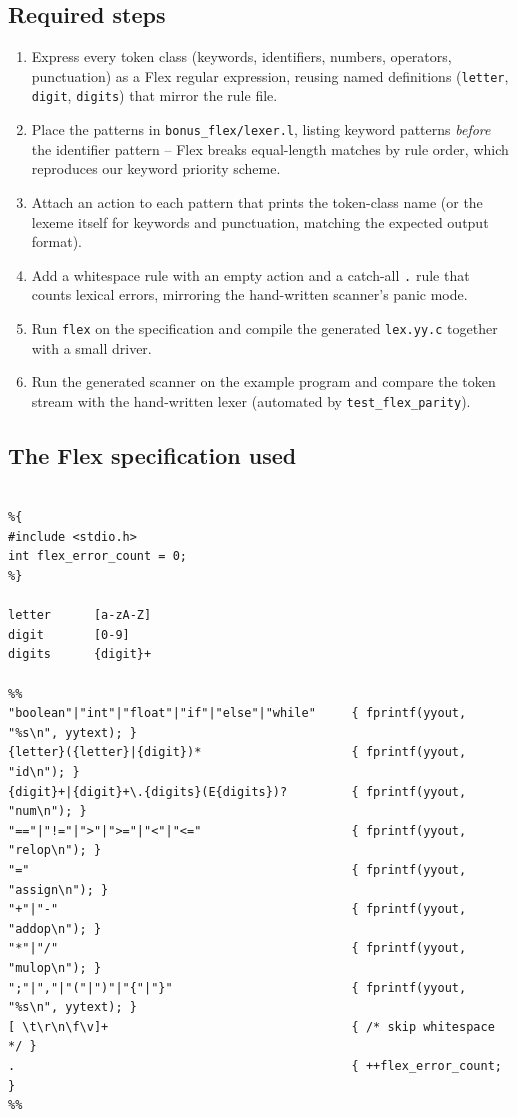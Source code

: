 \documentclass[11pt,a4paper]{article}
\begin{document}
\subsection{Required steps}
\begin{enumerate}
    \item Express every token class (keywords, identifiers, numbers, operators,
          punctuation) as a Flex regular expression, reusing named definitions
          (\texttt{letter}, \texttt{digit}, \texttt{digits}) that mirror the rule
          file.
    \item Place the patterns in \texttt{bonus\_flex/lexer.l}, listing keyword
          patterns \emph{before} the identifier pattern -- Flex breaks
          equal-length matches by rule order, which reproduces our keyword
          priority scheme.
    \item Attach an action to each pattern that prints the token-class name
          (or the lexeme itself for keywords and punctuation, matching the
          expected output format).
    \item Add a whitespace rule with an empty action and a catch-all \texttt{.}
          rule that counts lexical errors, mirroring the hand-written scanner's
          panic mode.
    \item Run \texttt{flex} on the specification and compile the generated
          \texttt{lex.yy.c} together with a small driver.
    \item Run the generated scanner on the example program and compare the token
          stream with the hand-written lexer (automated by
          \texttt{test\_flex\_parity}).
\end{enumerate}

\subsection{The Flex specification used}
\begin{lstlisting}[basicstyle=\ttfamily\small]
%option noyywrap

%{
#include <stdio.h>
int flex_error_count = 0;
%}

letter      [a-zA-Z]
digit       [0-9]
digits      {digit}+

%%
"boolean"|"int"|"float"|"if"|"else"|"while"     { fprintf(yyout, "%s\n", yytext); }
{letter}({letter}|{digit})*                     { fprintf(yyout, "id\n"); }
{digit}+|{digit}+\.{digits}(E{digits})?         { fprintf(yyout, "num\n"); }
"=="|"!="|">"|">="|"<"|"<="                     { fprintf(yyout, "relop\n"); }
"="                                             { fprintf(yyout, "assign\n"); }
"+"|"-"                                         { fprintf(yyout, "addop\n"); }
"*"|"/"                                         { fprintf(yyout, "mulop\n"); }
";"|","|"("|")"|"{"|"}"                         { fprintf(yyout, "%s\n", yytext); }
[ \t\r\n\f\v]+                                  { /* skip whitespace */ }
.                                               { ++flex_error_count; }
%%
\end{lstlisting}
\end{document}
